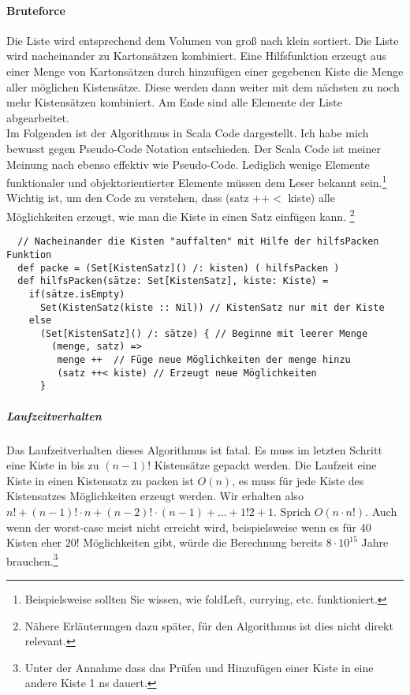\paragraph{Bruteforce}
Die Liste wird entsprechend dem Volumen von groß nach klein sortiert.
Die Liste wird nacheinander zu Kartonsätzen kombiniert.
Eine Hilfsfunktion erzeugt aus einer Menge von Kartonsätzen durch hinzufügen einer gegebenen Kiste die Menge aller möglichen Kistensätze.
Diese werden dann weiter mit dem nächsten zu noch mehr Kistensätzen kombiniert.
Am Ende sind alle Elemente der Liste abgearbeitet. \\
Im Folgenden ist der Algorithmus in Scala Code dargestellt. Ich habe mich bewusst gegen Pseudo-Code Notation entschieden.
Der Scala Code ist meiner Meinung nach ebenso effektiv wie Pseudo-Code.
Lediglich wenige Elemente funktionaler und objektorientierter Elemente müssen dem Leser bekannt sein.\footnote{Beispielsweise sollten Sie wissen, wie foldLeft, currying, etc. funktioniert.}\\
Wichtig ist, um den Code zu verstehen, dass (satz $++<$ kiste) alle Möglichkeiten erzeugt, wie man die Kiste in einen Satz einfügen kann.
\footnote{Nähere Erläuterungen dazu später, für den Algorithmus ist dies nicht direkt relevant.}
\lstset{language=Scala}
\lstset{basicstyle=\scriptsize}
\begin{lstlisting}
  // Nacheinander die Kisten "auffalten" mit Hilfe der hilfsPacken Funktion
  def packe = (Set[KistenSatz]() /: kisten) ( hilfsPacken )
  def hilfsPacken(sätze: Set[KistenSatz], kiste: Kiste) =
    if(sätze.isEmpty)
      Set(KistenSatz(kiste :: Nil)) // KistenSatz nur mit der Kiste
    else
      (Set[KistenSatz]() /: sätze) { // Beginne mit leerer Menge
        (menge, satz) =>
         menge ++  // Füge neue Möglichkeiten der menge hinzu
         (satz ++< kiste) // Erzeugt neue Möglichkeiten
      }
\end{lstlisting}
\subparagraph{Laufzeitverhalten}
Das Laufzeitverhalten dieses Algorithmus ist fatal. Es muss im letzten Schritt eine Kiste in bis zu $(n-1)!$ Kistensätze gepackt werden.
Die Laufzeit eine Kiste in einen Kistensatz zu packen ist $O(n)$, es muss für jede Kiste des Kistensatzes Möglichkeiten erzeugt werden.
Wir erhalten also $n! + (n-1)! \cdot n + (n-2)! \cdot (n-1) + \dots + 1!2 + 1$. Sprich $O(n \cdot n!)$.
Auch wenn der worst-case meist nicht erreicht wird, beispielsweise wenn es für 40 Kisten eher $20!$ Möglichkeiten gibt,
würde die Berechnung bereits $8 \cdot 10^{15}$ Jahre brauchen.\footnote{Unter der Annahme dass das Prüfen und Hinzufügen einer Kiste in eine andere Kiste 1 ns dauert.} \\
